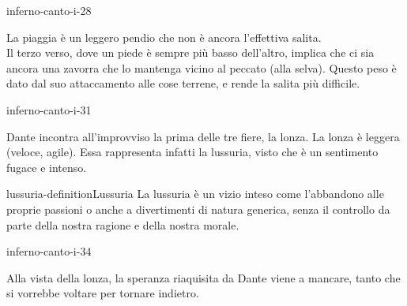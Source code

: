 \documentclass[preview]{standalone}
\begin{document}
\begin{snippet}{inferno-canto-i-28}

    La piaggia è un leggero pendio che non è ancora l'effettiva salita.
    \\
    Il terzo verso, dove un piede è sempre più basso dell'altro,
    implica che ci sia ancora una zavorra che lo mantenga vicino al peccato (alla selva).
    Questo peso è dato dal suo attaccamento alle cose terrene, e rende la salita più difficile.
\end{snippet}

\begin{snippet}{inferno-canto-i-31}

    Dante incontra all'improvviso la prima delle tre fiere, la lonza.
    La lonza è leggera (veloce, agile). Essa rappresenta infatti la lussuria, visto che è
    un sentimento fugace e intenso.
\end{snippet}

\begin{snippetdefinition}{lussuria-definition}{Lussuria}
    La lussuria è un vizio inteso come l'abbandono alle proprie passioni o anche a divertimenti di natura generica, senza il controllo da parte della nostra ragione e della nostra morale.
\end{snippetdefinition}

\begin{snippet}{inferno-canto-i-34}

    Alla vista della lonza, la speranza riaquisita da Dante viene a mancare, tanto che
    si vorrebbe voltare per tornare indietro.
\end{snippet}
\end{document}
